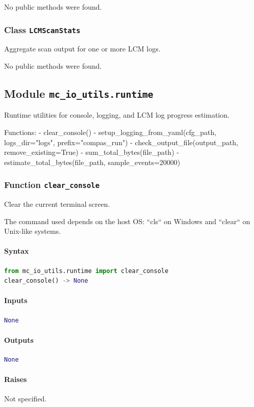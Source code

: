 \documentclass[11pt]{article}
\begin{document}
No public methods were found.

\subsubsection{Class \texttt{LCMScanStats}}
Aggregate scan output for one or more LCM logs.

No public methods were found.

\subsection{Module \texttt{mc\_io\_utils.runtime}}
Runtime utilities for console, logging, and LCM log progress estimation.

Functions:
- clear\_console()
- setup\_logging\_from\_yaml(cfg\_path, logs\_dir="logs", prefix="compas\_run")
- check\_output\_file(output\_path, remove\_existing=True)
- sum\_total\_bytes(file\_path)
- estimate\_total\_bytes(file\_path, sample\_events=20000)

\subsubsection{Function \texttt{clear\_console}}
Clear the current terminal screen.

The command used depends on the host OS:
``cls`` on Windows and ``clear`` on Unix-like systems.

\paragraph{Syntax}
\begin{lstlisting}[language=Python]
from mc_io_utils.runtime import clear_console
clear_console() -> None
\end{lstlisting}
\paragraph{Inputs}
\begin{lstlisting}[language=Python]
None
\end{lstlisting}
\paragraph{Outputs}
\begin{lstlisting}[language=Python]
None
\end{lstlisting}
\paragraph{Raises}
Not specified.
\end{document}
